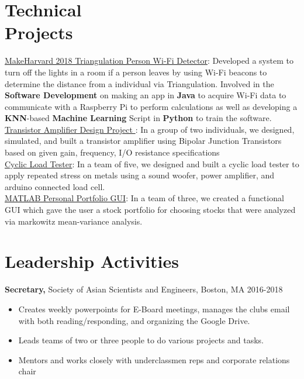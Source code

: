 \documentclass[margin]{res}
\begin{document}
\begin{resume}
\section{Technical \\ Projects} 
\underline{MakeHarvard 2018 Triangulation Person Wi-Fi Detector}: Developed a system to turn off the lights in a room if a person leaves by using Wi-Fi beacons to determine the distance from a individual via Triangulation. Involved in the \textbf{Software Development} on making an app in \textbf{Java} to acquire Wi-Fi data to communicate with a Raspberry Pi to perform calculations as well as developing a \textbf{KNN}-based \textbf{Machine Learning} Script in \textbf{Python} to train the software. \\
\underline{Transistor Amplifier Design Project }: In a group of two individuals, we designed, simulated, and built a transistor amplifier using Bipolar Junction Transistors based on given gain, frequency, I/O resistance specifications  \\
\underline{Cyclic Load Tester}: In a team of five, we designed and built a cyclic load tester to apply repeated stress on metals using a sound woofer, power amplifier, and arduino connected load cell. \\
\underline{MATLAB Personal Portfolio GUI}: In a team of three, we created a functional GUI which gave the user a stock portfolio for choosing stocks that were analyzed via markowitz mean-variance analysis. 			
			
			
			
			
			
\section{Leadership   Activities} 
               {\bf Secretary,} Society of Asian Scientists and Engineers, Boston, MA    \hfill         2016-2018
                \begin{itemize} \itemsep -0.5pt
                \item Creates weekly powerpoints for E-Board meetings, manages the clubs email with both reading/responding, and organizing the Google Drive.
                \item Leads teams of two or three people to do various projects and tasks.
              \item Mentors and works closely with underclassmen reps and corporate relations chair

		 \end{itemize}
 


\end{resume}
\end{document}
